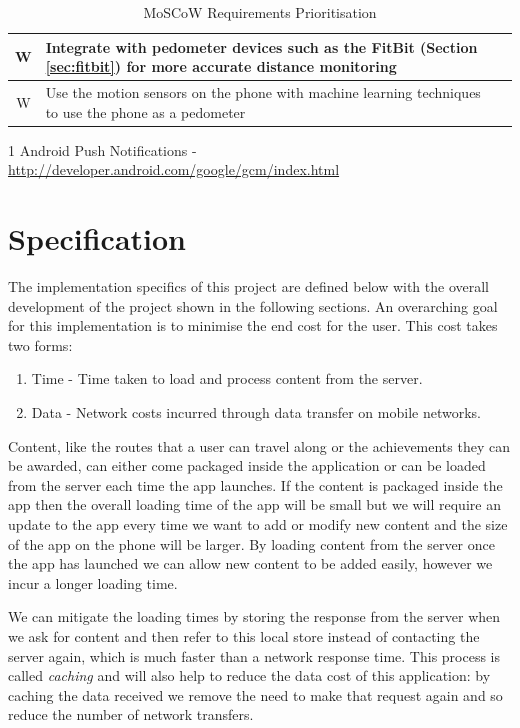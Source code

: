 \begin{table}[h]
\begin{threeparttable}[b]
\begin{tabular}{ | c | p{12cm} | c | }
    \\\hline
    W & Integrate with pedometer devices such as the FitBit (Section
    \ref{sec:fitbit}) for more accurate distance monitoring &
    \\\hline
    W & Use the motion sensors on the phone with machine learning
    techniques to use the phone as a pedometer & \\\hline
  \end{tabular}
  \begin{tablenotes}
    \item[1] Android Push Notifications - \url{http://developer.android.com/google/gcm/index.html}
  \end{tablenotes}
  \caption{MoSCoW Requirements Prioritisation}
  \label{table:moscow}
  \end{threeparttable}
\end{table}

\section{Specification}
\label{sec:specification}
The implementation specifics of this project are defined below with
the overall development of the project shown in the following sections.
An overarching goal for this implementation is to minimise the end cost
for the user. This cost takes two forms: 
\begin{enumerate}
\item Time - Time taken to load and process content from the server.
\item Data - Network costs incurred through data transfer on mobile networks.
\end{enumerate}

Content, like the routes that a user can travel along or the
achievements they can be awarded, can either come packaged inside the
application or can be loaded from the server each time the app
launches. If the content is packaged inside the app then the overall
loading time of the app will be small but we will require an update to
the app every time we want to add or modify new content and the size
of the app on the phone will be larger. By loading content from the
server once the app has launched we can allow new content to be added
easily, however we incur a longer loading time.

We can mitigate the loading times by storing the response from the
server when we ask for content and then refer to this local store
instead of contacting the server again, which is much faster than a
network response time. This process is called \emph{caching} and will
also help to reduce the data cost of this application: by caching the
data received we remove the need to make that request again and so
reduce the number of network transfers.

